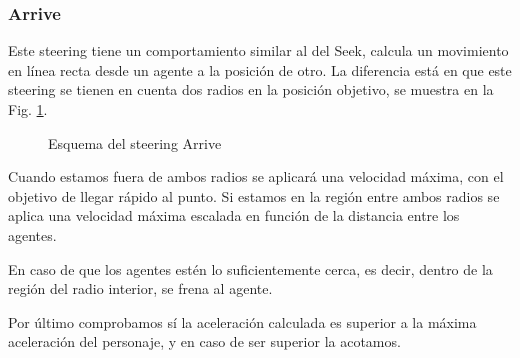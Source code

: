 \subsubsection{Arrive}

Este steering tiene un comportamiento similar al del Seek, calcula un movimiento en línea recta desde un agente a la posición de otro. La diferencia está en que este steering se tienen en cuenta dos radios en la posición objetivo, se muestra en la Fig. \ref{fig:arrive}. 

\begin{figure}[H]
    \centering
    \caption{Esquema del steering Arrive}
    \label{fig:arrive}
\end{figure}

Cuando estamos fuera de ambos radios se aplicará una velocidad máxima, con el objetivo de llegar rápido al punto. Si estamos en la región entre ambos radios se aplica una velocidad máxima escalada en función de la distancia entre los agentes.



En caso de que los agentes estén lo suficientemente cerca, es decir, dentro de la región del radio interior, se frena al agente.




Por último comprobamos sí la aceleración calculada es superior a la máxima aceleración del personaje, y en caso de ser superior la acotamos. 


